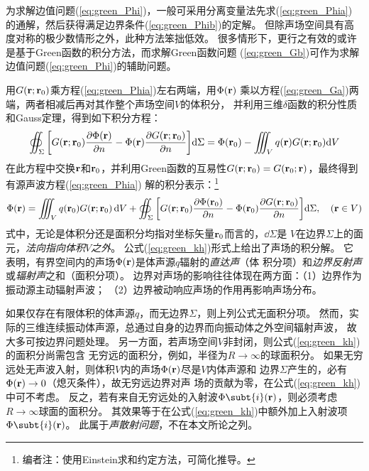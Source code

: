 \documentclass[UTF8]{ctexbook}
\begin{document}
为求解边值问题(\ref{eq:green_Phi})，一般可采用分离变量法先求(\ref{eq:green_Phia})
的通解，然后获得满足边界条件(\ref{eq:green_Phib})的定解。
但除声场空间具有高度对称的极少数情形之外，此种方法笨拙低效。
很多情形下，更行之有效的或许是基于Green函数的积分方法，而求解Green函数问题
(\ref{eq:green_Gb})可作为求解边值问题(\ref{eq:green_Phi})的辅助问题。

用$G(\vb{r};\vb{r}_0)$乘方程(\ref{eq:green_Phia})左右两端，用$\Phi(\vb{r})$
乘以方程(\ref{eq:green_Ga})两端，两者相减后再对其作整个声场空间$V$的体积分，
并利用三维$\delta $函数的积分性质和Gauss定理，得到如下积分方程：
$$
\oiint_\Sigma\qty[G(\vb{r};\vb{r}_0) \pdv{\Phi(\vb{r})}{n} - \Phi(
\vb{r}) \pdv{G(\vb{r};\vb{r}_0)}{n}] \dd \Sigma 
=\Phi(\vb{r}_0) - \iiint_V q(\vb{r}) G(\vb{r};\vb{r}_0) \dd V$$
在此方程中交换$\vb{r}$和$\vb{r}_0$，并利用Green函数的互易性$G(\vb{r};
\vb{r}_0) = G(\vb{r}_0;\vb{r})$，最终得到有源声波方程(\ref{eq:green_Phia})
解的积分表示：\footnote{编者注：使用Einstein求和约定方法，可简化推导。}
\begin{equation}
	\Phi(\vb{r}) = \iiint_V q(\vb{r}_0) G(\vb{r};\vb{r}_0) \dd{V}
	+\oiint_\Sigma \qty[G(\vb{r};\vb{r}_0) \pdv{\Phi(\vb{r}_0)}{n}
	- \Phi(\vb{r}_0) \pdv{G(\vb{r};\vb{r}_0)}{n}]\dd \Sigma
	\qc (\vb{r}\in V)\label{eq:green_kh}
\end{equation}
式中，无论是体积分还是面积分均指对坐标矢量$\vb{r}_0$而言的，$\dd\Sigma$是
$V$在边界$\Sigma$上的面元，\emph{法向指向体积$V$之外}。
公式(\ref{eq:green_kh})形式上给出了声场的积分解。
它表明，有界空间内的声场$\Phi(\vb{r})$是体声源$q$辐射的\emph{直达声}（体
积分项）和\emph{边界反射声}或\emph{辐射声}之和（面积分项）。
边界对声场的影响往往体现在两方面：（1）边界作为振动源主动辐射声波；
（2）边界被动响应声场的作用再影响声场分布。

如果仅存在有限体积的体声源$q$，而无边界$\Sigma$，则上列公式无面积分项。
然而，实际的三维连续振动体声源，总通过自身的边界而向振动体之外空间辐射声波，
故大多可按边界问题处理。
另一方面，若声场空间$V$非封闭，则公式(\ref{eq:green_kh})的面积分尚需包含
无穷远的面积分，例如，半径为$R\to \infty$的球面积分。
如果无穷远处无声波入射，则体积$V$内的声场$\Phi(\vb{r})$尽是$V$内体声源和
边界$\Sigma$产生的，必有$\Phi(\vb{r})\to 0$（熄灭条件），故无穷远边界对声
场的贡献为零，在公式(\ref{eq:green_kh})中可不考虑。
反之，若有来自无穷远处的入射波$\Phi\subt{i}(\vb{r})$，则必须考虑$R\to \infty
$球面的面积分。
其效果等于在公式(\ref{eq:green_kh})中额外加上入射波项$\Phi\subt{i}(\vb{r})$。
此属于\emph{声散射问题}，不在本文所论之列。
\end{document}
